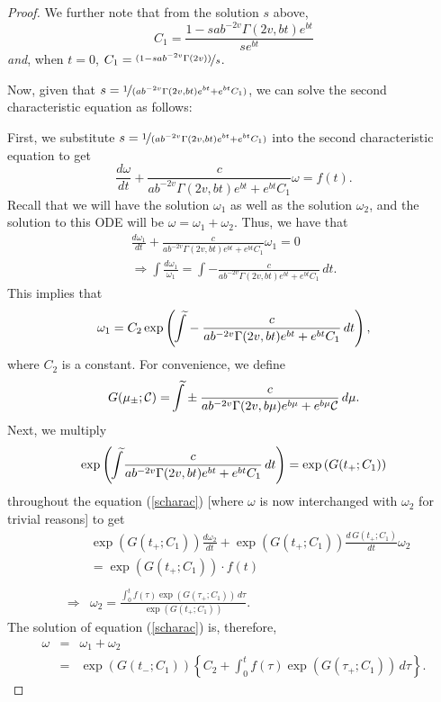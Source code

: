 \documentclass[preprint, 12pt]{elsarticle}
\numberwithin{equation}{section}
\theoremstyle{plain}
\theoremstyle{remark}
\newcommand{\nocomma}{}
\begin{document}
\begin{proof}
We further note that from the solution $s$ above, 
\[C_1 = \displaystyle\frac{1 - s a b^{- 2 v} \Gamma (2 v \nocomma, b t) e^{b t}}{s e^{bt}}\] 
{\emph{and}}, when $t=0$, $\displaystyle{C_1 = \nicefrac{(1 - s a b^{- 2 v} \Gamma (2 v \nocomma))}{s}}$.
  
Now, given that $s = \displaystyle\nicefrac{1}{(a b^{- 2 v} \Gamma (2 v \nocomma, b t) e^{b t} + e^{bt} C_1)}$, we can solve the second characteristic equation as follows:
   
First, we substitute $\displaystyle{s = \nicefrac{1}{(a b^{- 2 v} \Gamma (2 v \nocomma, b t) e^{b t} + e^{bt} C_1)}}$ into the second characteristic equation to get
\begin{equation}
\frac{d \omega}{d t} + \frac{c}{a b^{- 2 v} \Gamma (2 v \nocomma, b t) e^{b t} + e^{bt} C_1} \omega = f (t) \label{scharac}.
\end{equation}
Recall that we will have the solution $\omega_1$ as well as the solution $\omega_2$, and the solution to this ODE will be $\omega = \omega_1 + \omega_2$. Thus, we have that
\[ \begin{split}
\frac{d \omega_1}{d t} + \frac{c}{a b^{- 2 v} \Gamma (2 v \nocomma, b t) e^{b t} + e^{bt} C_1} \omega_1 = 0\\ 
\Longrightarrow \int \frac{d \omega_1}{\omega_1} = \int - \frac{c}{a b^{- 2 v} \Gamma (2 v \nocomma, b t) e^{b t} + e^{bt} C_1}\, d t. 
\end{split}\]
This implies that
\[ \omega_1 = C_2 \exp \left( \kern6pt\widetilde{\kern-7pt\int} - \frac{c}{a b^{- 2 v} \Gamma (2 v \nocomma, b t) e^{b t} + e^{bt} C_1}\, d t \right), \]
where $C_2$ is a constant. For convenience, we define
\[ G (\mu_{\pm} ; \mathcal{C}) = \kern6pt\widetilde{\kern-7pt\int} \pm \frac{c}{a b^{- 2 v} \Gamma (2 v \nocomma, b \mu) e^{b \mu} +e^{b\mu} \mathcal{C}}\, d \mu. \]
Next, we multiply
\[ \exp \left( \kern6pt \widetilde{\kern-7pt\int} \frac{c}{a b^{- 2 v} \Gamma (2 v \nocomma, b t) e^{b t} + e^{bt} C_1}\, d t  \right) = \exp \left( G (t_+ ; C_1) \right) \]
throughout the equation (\ref{scharac}) [where $\omega$ is now interchanged with $\omega_2$ for trivial reasons] to get
\begin{eqnarray*}
& & \exp (G (t_+ ; C_1)) \nocomma \frac{d \omega_2}{d t} + \exp (G (t_+; C_1)) \nocomma \frac{d\,G (t_+ ; C_1)}{d t} \omega_2 \\ 
& & = \exp (G (t_+ ; C_1)) \cdot f (t) \\ 
& & \\
& \Longrightarrow & \omega_2 = \frac{\int_0^t f (\tau) \exp (G (\tau_+ ; C_1))\, d \tau}{\exp (G (t_+ ; C_1)) \nocomma}.
\end{eqnarray*}
The solution of equation (\ref{scharac}) is, therefore,
\begin{eqnarray}
\omega & = & \omega_1 + \omega_2 \label{scharacsol} \\
& = & \exp (G (t_- ; C_1)) \left\{ C_2 + \int_0^t f (\tau) \exp (G (\tau_+ ; C_1))\, d\tau \right\} \nonumber. 
\end{eqnarray}
  

\end{proof}
\end{document}
